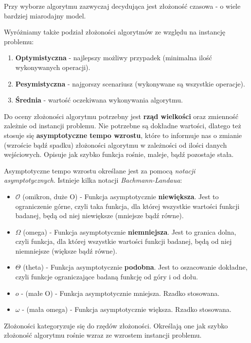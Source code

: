 Przy wyborze algorytmu zazwyczaj decydująca jest złożoność czasowa - o wiele bardziej miarodajny model.

Wyróżniamy także podział złożoności algorytmów ze względu na instancję problemu:
\begin{enumerate}
	\item \textbf{Optymistyczna} - najlepszy możliwy przypadek (minimalna ilość wykonywanych operacji).
	\item \textbf{Pesymistyczna} - najgorszy scenariusz (wykonywane są wszystkie operacje).
	\item \textbf{Średnia} - wartość oczekiwana wykonywania algorytmu.
\end{enumerate}

Do oceny złożoności algorytmu potrzebny jest \textbf{rząd wielkości} oraz zmienność zależnie od instancji problemu. Nie potrzebne są dokładne wartości, dlatego też stosuje się \textbf{asymptotyczne tempo wzrostu}, które to informuje nas o zmianie (wzroście bądź spadku) złożoności algorytmu w zależności od ilości danych wejściowych. Opisuje jak szybko funkcja rośnie, maleje, bądź pozostaje stała.

Asymptotyczne tempo wzrostu określane jest za pomocą \textit{notacji asymptotycznych}. Istnieje kilka notacji \textit{Bachmann-Landaua}:
\begin{itemize}
	\item $\mathcal{O}$ (omikron, duże O)  - Funkcja asymptotycznie \textbf{niewiększa}. Jest to ograniczenie górne, czyli taka funkcja, dla której wszystkie wartości funkcji badanej, będą od niej niewiększe (mniejsze bądź równe).
	\item $\Omega$ (omega) - Funkcja asymptotycznie \textbf{niemniejsza}. Jest to granica dolna, czyli funkcja, dla której wszystkie wartości funkcji badanej, będą od niej niemniejsze (większe bądź równe).
	\item $\Theta$ (theta) - Funkcja asymptotycznie \textbf{podobna}. Jest to oszacowanie dokładne, czyli funkcje ograniczające badaną funkcję od góry i od dołu.
	\item $o$ - (małe O) - Funkcja asymptotycznie mniejsza. Rzadko stosowana.
	\item $\omega$ - (mała omega) - Funkcja asymptotycznie większa. Rzadko stosowana.
\end{itemize}

Złożoności kategoryzuje się do rzędów złożoności. Określają one jak szybko złożoność algorytmu rośnie wzraz ze wzrostem instancji problemu.

